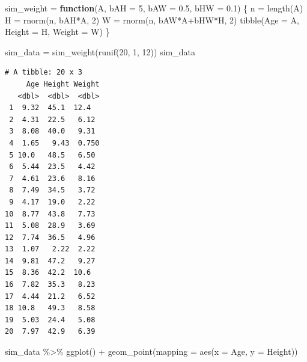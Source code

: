 \documentclass[
  letterpaper,
  DIV=11,
  numbers=noendperiod]{scrartcl}
\newenvironment{Shaded}{\begin{snugshade}}{\end{snugshade}}
\newcommand{\AttributeTok}[1]{\textcolor[rgb]{0.40,0.45,0.13}{#1}}
\newcommand{\ControlFlowTok}[1]{\textcolor[rgb]{0.00,0.23,0.31}{\textbf{#1}}}
\newcommand{\DecValTok}[1]{\textcolor[rgb]{0.68,0.00,0.00}{#1}}
\newcommand{\FloatTok}[1]{\textcolor[rgb]{0.68,0.00,0.00}{#1}}
\newcommand{\FunctionTok}[1]{\textcolor[rgb]{0.28,0.35,0.67}{#1}}
\newcommand{\NormalTok}[1]{\textcolor[rgb]{0.00,0.23,0.31}{#1}}
\newcommand{\OtherTok}[1]{\textcolor[rgb]{0.00,0.23,0.31}{#1}}
\newcommand{\SpecialCharTok}[1]{\textcolor[rgb]{0.37,0.37,0.37}{#1}}
\begin{document}
\begin{Shaded}
\begin{Highlighting}[]
\NormalTok{sim\_weight }\OtherTok{=} \ControlFlowTok{function}\NormalTok{(A, }\AttributeTok{bAH =} \DecValTok{5}\NormalTok{, }\AttributeTok{bAW =} \FloatTok{0.5}\NormalTok{, }\AttributeTok{bHW =} \FloatTok{0.1}\NormalTok{) \{}
\NormalTok{    n }\OtherTok{=} \FunctionTok{length}\NormalTok{(A)}
\NormalTok{    H }\OtherTok{=} \FunctionTok{rnorm}\NormalTok{(n, bAH}\SpecialCharTok{*}\NormalTok{A, }\DecValTok{2}\NormalTok{)}
\NormalTok{    W }\OtherTok{=} \FunctionTok{rnorm}\NormalTok{(n, bAW}\SpecialCharTok{*}\NormalTok{A}\SpecialCharTok{+}\NormalTok{bHW}\SpecialCharTok{*}\NormalTok{H, }\DecValTok{2}\NormalTok{)}
    \FunctionTok{tibble}\NormalTok{(}\AttributeTok{Age =}\NormalTok{ A, }\AttributeTok{Height =}\NormalTok{ H, }\AttributeTok{Weight =}\NormalTok{ W)}
\NormalTok{\}}

\NormalTok{sim\_data }\OtherTok{=} \FunctionTok{sim\_weight}\NormalTok{(}\FunctionTok{runif}\NormalTok{(}\DecValTok{20}\NormalTok{, }\DecValTok{1}\NormalTok{, }\DecValTok{12}\NormalTok{))}
\NormalTok{sim\_data}
\end{Highlighting}
\end{Shaded}

\begin{verbatim}
# A tibble: 20 x 3
     Age Height Weight
   <dbl>  <dbl>  <dbl>
 1  9.32  45.1  12.4  
 2  4.31  22.5   6.12 
 3  8.08  40.0   9.31 
 4  1.65   9.43  0.750
 5 10.0   48.5   6.50 
 6  5.44  23.5   4.42 
 7  4.61  23.6   8.16 
 8  7.49  34.5   3.72 
 9  4.17  19.0   2.22 
10  8.77  43.8   7.73 
11  5.08  28.9   3.69 
12  7.74  36.5   4.96 
13  1.07   2.22  2.22 
14  9.81  47.2   9.27 
15  8.36  42.2  10.6  
16  7.82  35.3   8.23 
17  4.44  21.2   6.52 
18 10.8   49.3   8.58 
19  5.03  24.4   5.08 
20  7.97  42.9   6.39 
\end{verbatim}

\begin{Shaded}
\begin{Highlighting}[]
\NormalTok{sim\_data }\SpecialCharTok{\%\textgreater{}\%}
    \FunctionTok{ggplot}\NormalTok{() }\SpecialCharTok{+}
    \FunctionTok{geom\_point}\NormalTok{(}\AttributeTok{mapping =} \FunctionTok{aes}\NormalTok{(}\AttributeTok{x =}\NormalTok{ Age, }\AttributeTok{y =}\NormalTok{ Height))}
\end{Highlighting}
\end{Shaded}
\end{document}
